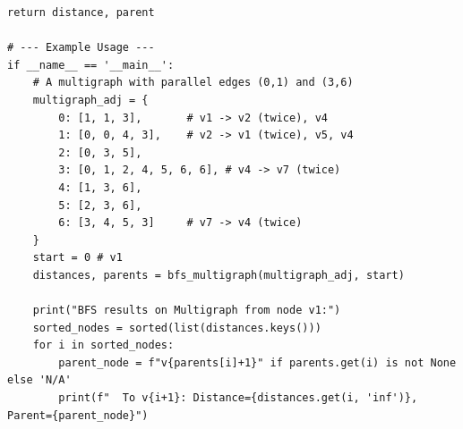 \documentclass[a4paper,12pt]{article}
\begin{document}
\begin{lstlisting}[style=pythonstyle, caption={Cài đặt BFS cho đa đồ thị trong Python.}, label={lst:python_bfs_9_full}]
    return distance, parent

# --- Example Usage ---
if __name__ == '__main__':
    # A multigraph with parallel edges (0,1) and (3,6)
    multigraph_adj = {
        0: [1, 1, 3],       # v1 -> v2 (twice), v4
        1: [0, 0, 4, 3],    # v2 -> v1 (twice), v5, v4
        2: [0, 3, 5],
        3: [0, 1, 2, 4, 5, 6, 6], # v4 -> v7 (twice)
        4: [1, 3, 6],
        5: [2, 3, 6],
        6: [3, 4, 5, 3]     # v7 -> v4 (twice)
    }
    start = 0 # v1
    distances, parents = bfs_multigraph(multigraph_adj, start)
    
    print("BFS results on Multigraph from node v1:")
    sorted_nodes = sorted(list(distances.keys()))
    for i in sorted_nodes:
        parent_node = f"v{parents[i]+1}" if parents.get(i) is not None else 'N/A'
        print(f"  To v{i+1}: Distance={distances.get(i, 'inf')}, Parent={parent_node}")
\end{lstlisting}
\end{document}
